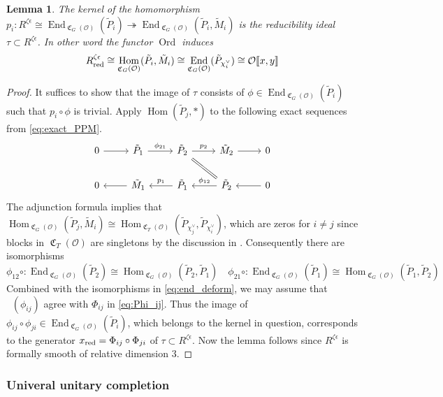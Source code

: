 \documentclass[leqno]{amsart}
\newtheorem{lem}[thm]{Lemma}
\theoremstyle{definition}
\theoremstyle{remark}
\newcommand{\oo}{\mathcal{O}}
\DeclareMathOperator{\End}{End}
\DeclareMathOperator{\Hom}{Hom}
\DeclareMathOperator{\fC}{\mathfrak{C}} %
\DeclareMathOperator{\V}{\check{\mathbf{V}}} %
\DeclareMathOperator{\Ord}{Ord} %
\newcommand{\red}{\textnormal{red}}
\newcommand{\xx}{x_\textnormal{red}}
\begin{document}
\begin{lem}\label{lem:ker_red}
	The kernel of the homomorphism
    $p_i\colon R^{\zeta\epsilon}\cong
    \End_{\fC_G(\oo)}(\tilde{P}_i)\twoheadrightarrow
	\End_{\fC_G(\oo)}(\tilde{P}_i, \tilde{M}_i)$
	is the reducibility ideal $\tau\subset R^{\zeta\epsilon}$.
    In other word the functor $\Ord$ induces
	\begin{equation}
	R^{\zeta\epsilon}_\red\cong 
	\Hom_{\fC_G(\oo)}(\tilde{P}_i, \tilde{M}_i)\cong
	\End_{\fC_G(\oo)}(\tilde{P}_{\chi_i^\vee})\cong
	\oo\llbracket x,y\rrbracket
	\end{equation}
\end{lem}
\begin{proof}
It suffices to show that 
the image of $\tau$ consists of 
$\phi\in \End_{\fC_G(\oo)}(\tilde{P}_i)$
such that $p_i\circ \phi$ is trivial.
Apply $\Hom(\tilde{P}_j,*)$
to the following exact sequences
from \eqref{eq:exact_PPM}.
\[
\begin{tikzcd}
	0 \arrow[r]&
	\tilde{P}_1  \arrow[r,"\phi_{21}"]  &
	\tilde{P}_2 \arrow[r,"p_2"] \arrow[dr,equal] &
	\tilde{M}_2  \arrow[r] & 0 \\
	0 & 
	\tilde{M}_1 \arrow[l]&
	\tilde{P}_1 \arrow[l,"p_1",swap]  &
	\tilde{P}_2  \arrow[l,"\phi_{12}",swap]  & 
	0  \arrow[l] 
\end{tikzcd}
\]
The adjunction formula implies that
$\Hom_{\fC_G(\oo)}(\tilde{P}_j,\tilde{M}_i)\cong
\Hom_{\fC_T(\oo)}
(\tilde{P}_{\chi_j^\vee},\tilde{P}_{\chi_i^\vee})$,
which are zeros for $i\neq j$
since blocks in $\fC_T(\oo)$ are singletons
by the discussion in \cite[\S 7.2]{pask}.
Consequently there are isomorphisms
\[
	\phi_{12}\circ\colon
	\End_{\fC_G(\oo)}(\tilde{P}_2)\cong
	\Hom_{\fC_G(\oo)}(\tilde{P}_2, \tilde{P}_1)\quad
	\phi_{21}\circ\colon
	\End_{\fC_G(\oo)}(\tilde{P}_1)\cong
	\Hom_{\fC_G(\oo)}(\tilde{P}_1, \tilde{P}_2)
\]
Combined with the isomorphisms in \eqref{eq:end_deform},
we may assume that $\V(\phi_{ij})$ agree with 
$\Phi_{ij}$ in \eqref{eq:Phi_ij}.
Thus the image of 
$\phi_{ij}\circ\phi_{ji}\in \End_{\fC_G(\oo)}(\tilde{P}_i)$,
which belongs to the kernel in question,
corresponds to the generator 
$\xx=\Phi_{ij}\circ\Phi_{ji}$ of 
$\tau\subset R^{\zeta\epsilon}$.
Now the lemma follows 
since $R^{\zeta\epsilon}$ is formally smooth of relative dimension  $3$.
\end{proof}

\subsubsection{Univeral unitary completion}
\end{document}
